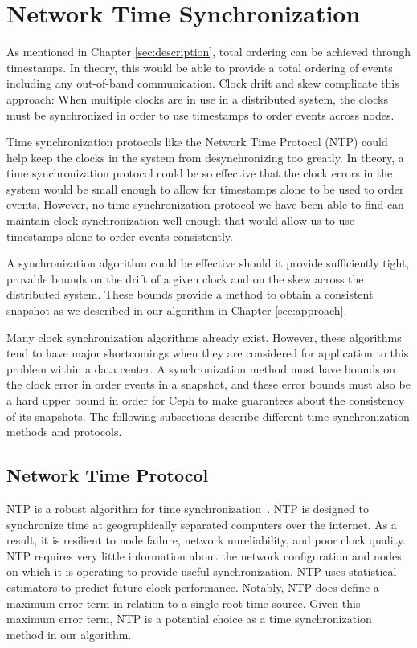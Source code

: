 \section{Network Time Synchronization}

As mentioned in Chapter \ref{sec:description}, total ordering can be
achieved through timestamps. In theory, this would be able to provide
a total ordering of events including any out-of-band
communication. Clock drift and skew complicate this approach: When
multiple clocks are in use in a distributed system, the clocks must be
synchronized in order to use timestamps to order events across nodes.

Time synchronization protocols like the Network Time Protocol (NTP)
could help keep the clocks in the system from desynchronizing too
greatly. In theory, a time synchronization protocol could be so effective that 
the clock errors in the system would be small enough to allow for timestamps 
alone to be used to order events. However, no time synchronization protocol 
we have been able to
find can maintain clock synchronization well enough that would allow
us to use timestamps alone to order events consistently. 

A synchronization algorithm could be effective should it provide
sufficiently tight, provable bounds on the drift of a given clock and
on the skew across the distributed system. These bounds provide a
method to obtain a consistent snapshot as we described in our
algorithm in Chapter \ref{sec:approach}.

Many clock synchronization algorithms already exist. However, these
algorithms tend to have major shortcomings when they are considered
for application to this problem within a data center. A
synchronization method must have bounds on the clock error in order
events in a snapshot, and these error bounds must also be a hard upper
bound in order for Ceph to make guarantees about the consistency of
its snapshots. The following subsections describe different time
synchronization methods and protocols.

\subsection{Network Time Protocol}

NTP is a robust algorithm for time
synchronization~\citep{Burbank2010}. NTP is designed to synchronize
time at geographically separated computers over the internet. As a
result, it is resilient to node failure, network unreliability, and
poor clock quality. NTP requires very little information about the
network configuration and nodes on which it is operating to provide
useful synchronization. NTP uses statistical estimators to predict
future clock performance. Notably, NTP does define a maximum error
term in relation to a single root time source. Given this maximum
error term, NTP is a potential choice as a time synchronization method
in our algorithm.

